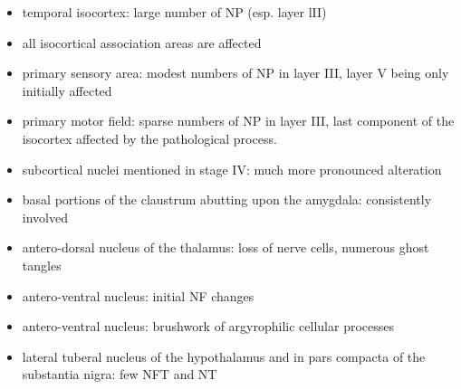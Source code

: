 \documentclass[fleqn]{article}\usepackage{caption}
\begin{document}
\begin{itemize}
\begin{itemize}
\begin{itemize}
\item temporal isocortex: large number of NP (esp. layer lII)
\item all isocortical association areas are affected
\item primary sensory area: modest numbers of NP in layer III, layer V being only initially affected
\item primary motor field: sparse numbers of NP in layer III, last component of the isocortex affected by
the pathological process.
\item subcortical nuclei mentioned in stage IV: much more pronounced alteration
\item basal portions of the claustrum abutting upon the amygdala: consistently involved
\item antero-dorsal nucleus of the thalamus:  loss of nerve cells, numerous ghost tangles
\item antero-ventral nucleus: initial NF changes 
\item antero-ventral nucleus: brushwork of argyrophilic cellular processes
\item lateral tuberal nucleus of the hypothalamus and in pars compacta of the substantia nigra: few NFT and NT
\end{itemize}


\end{itemize}
\end{itemize}
\end{document}
